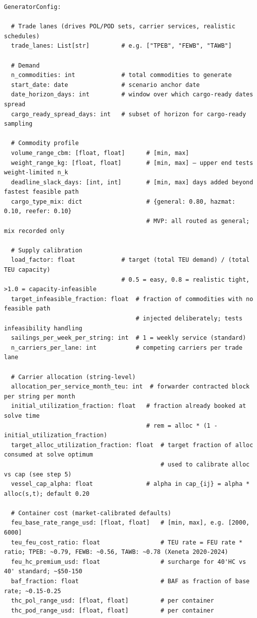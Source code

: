 \documentclass[11pt,a4paper]{article}
\theoremstyle{definition}
\begin{document}
\begin{verbatim}
GeneratorConfig:

  # Trade lanes (drives POL/POD sets, carrier services, realistic schedules)
  trade_lanes: List[str]         # e.g. ["TPEB", "FEWB", "TAWB"]

  # Demand
  n_commodities: int             # total commodities to generate
  start_date: date               # scenario anchor date
  date_horizon_days: int         # window over which cargo-ready dates spread
  cargo_ready_spread_days: int   # subset of horizon for cargo-ready sampling

  # Commodity profile
  volume_range_cbm: [float, float]      # [min, max]
  weight_range_kg: [float, float]       # [min, max] — upper end tests weight-limited n_k
  deadline_slack_days: [int, int]       # [min, max] days added beyond fastest feasible path
  cargo_type_mix: dict                  # {general: 0.80, hazmat: 0.10, reefer: 0.10}
                                        # MVP: all routed as general; mix recorded only

  # Supply calibration
  load_factor: float             # target (total TEU demand) / (total TEU capacity)
                                 # 0.5 = easy, 0.8 = realistic tight, >1.0 = capacity-infeasible
  target_infeasible_fraction: float  # fraction of commodities with no feasible path
                                     # injected deliberately; tests infeasibility handling
  sailings_per_week_per_string: int  # 1 = weekly service (standard)
  n_carriers_per_lane: int           # competing carriers per trade lane

  # Carrier allocation (string-level)
  allocation_per_service_month_teu: int  # forwarder contracted block per string per month
  initial_utilization_fraction: float   # fraction already booked at solve time
                                        # rem = alloc * (1 - initial_utilization_fraction)
  target_alloc_utilization_fraction: float  # target fraction of alloc consumed at solve optimum
                                            # used to calibrate alloc vs cap (see step 5)
  vessel_cap_alpha: float               # alpha in cap_{ij} = alpha * alloc(s,t); default 0.20

  # Container cost (market-calibrated defaults)
  feu_base_rate_range_usd: [float, float]   # [min, max], e.g. [2000, 6000]
  teu_feu_cost_ratio: float                 # TEU rate = FEU rate * ratio; TPEB: ~0.79, FEWB: ~0.56, TAWB: ~0.78 (Xeneta 2020-2024)
  feu_hc_premium_usd: float                 # surcharge for 40'HC vs 40' standard; ~$50-150
  baf_fraction: float                       # BAF as fraction of base rate; ~0.15-0.25
  thc_pol_range_usd: [float, float]         # per container
  thc_pod_range_usd: [float, float]         # per container


\end{verbatim}
\end{document}
